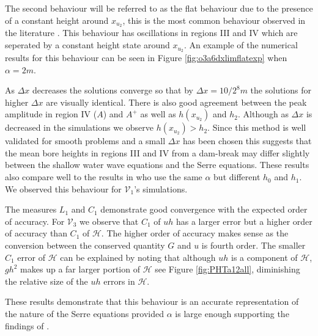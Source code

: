 \documentclass[SingleSpace,12pt,Journal]{Serre_ASCE}
\begin{document}
The second behaviour will be referred to as the flat behaviour due to the presence of a constant height around $x_{u_2}$, this is the most common behaviour observed in the literature \cite{Hank-etal-2010-2034,Dutykh-2014-315,Mitsotakis-etal-2014}. This behaviour has oscillations in regions III and IV which are seperated by a constant height state around $x_{u_2}$. An example of the numerical results for this behaviour can be seen in Figure \ref{fig:o3a6dxlimflatexp} when $\alpha = 2m$.

As $\Delta x$ decreases the solutions converge so that by $\Delta x = 10 / 2^8m$ the solutions for higher $\Delta x$ are visually identical. There is also good agreement between the peak amplitude in region IV ($A$) and $A^+$ as well as $h(x_{u_2})$ and $h_2$. Although as $\Delta x$ is decreased in the simulations we observe $h(x_{u_2}) > h_2$. Since this method is well validated for smooth problems and a small $\Delta x$ has been chosen this suggests that the mean bore heights in regions III and IV from a dam-break may differ slightly between the shallow water wave equations and the Serre equations. These results also compare well to the results in  who use the same $\alpha$ but different $h_0$ and $h_1$. We observed this behaviour for $\mathcal{V}_1$'s simulations.

The measures $L_1$ and $C_1$ demonstrate good convergence with the expected order of accuracy. For $\mathcal{V}_3$ we observe that $C_1$ of $uh$ has a larger error but a higher order of accuracy than $C_1$ of $\mathcal{H}$. The higher order of accuracy makes sense as the conversion between the conserved quantity $G$ and $u$ is fourth order. The smaller $C_1$ error of $\mathcal{H}$ can be explained by noting that although $uh$ is a component of $\mathcal{H}$, $gh^2$ makes up a far larger portion of $\mathcal{H}$ see Figure \ref{fig:PHTa12all}, diminishing the relative size of the $uh$ errors in $\mathcal{H}$.

These results demonstrate that this behaviour is an accurate representation of the nature of the Serre equations provided $\alpha$ is large enough supporting the findings of .
\end{document}
